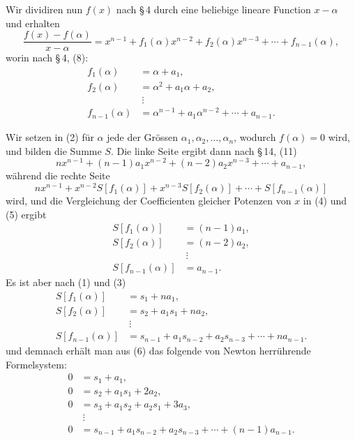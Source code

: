 \documentclass[11pt]{article}
\begin{document}
Wir dividiren nun $f(x)$ nach \S\,4 durch eine beliebige lineare Function $x-\alpha$ und erhalten
\begin{equation}
 \frac{f(x)-f(\alpha)}{x-\alpha}
   =x^{n-1}+f_1(\alpha)x^{n-2}+f_2(\alpha)x^{n-3}+\cdots+f_{n-1}(\alpha),
\tag{2}
\end{equation}
worin nach \S\,4, (8):
\begin{equation}
\begin{aligned}
 f_1(\alpha)&=\alpha+a_1,\\
 f_2(\alpha)&=\alpha^2+a_1\alpha+a_2,\\
 &\ \vdots\\
 f_{n-1}(\alpha)&=\alpha^{n-1}+a_1\alpha^{n-2}+\cdots+a_{n-1}.
\end{aligned}
\tag{3}
\end{equation}

Wir setzen in (2) für $\alpha$ jede der Grössen $\alpha_1,\alpha_2,\ldots,\alpha_n$, wodurch $f(\alpha)=0$ wird, und bilden die Summe $S$. Die linke Seite ergibt dann nach \S\,14, (11)
\begin{equation}
 n x^{n-1}+(n-1)a_1x^{n-2}+(n-2)a_2x^{n-3}+\cdots+a_{n-1},
\tag{4}
\end{equation}
während die rechte Seite
\begin{equation}
 n x^{n-1}+x^{n-2}S[f_1(\alpha)]+x^{n-3}S[f_2(\alpha)]+\cdots+S[f_{n-1}(\alpha)]
\tag{5}
\end{equation}
wird, und die Vergleichung der Coefficienten gleicher Potenzen von $x$ in (4) und (5) ergibt
\begin{equation}
\begin{aligned}
 S[f_1(\alpha)]&=(n-1)a_1,\\
 S[f_2(\alpha)]&=(n-2)a_2,\\
 &\ \vdots\\
 S[f_{n-1}(\alpha)]&=a_{n-1}.
\end{aligned}
\tag{6}
\end{equation}
Es ist aber nach (1) und (3)
\[
\begin{aligned}
 S[f_1(\alpha)]&=s_1+na_1,\\
 S[f_2(\alpha)]&=s_2+a_1s_1+na_2,\\
 &\ \vdots\\
 S[f_{n-1}(\alpha)]&=s_{n-1}+a_1s_{n-2}+a_2s_{n-3}+\cdots+na_{n-1}.
\end{aligned}
\]
und demnach erhält man aus (6) das folgende von Newton herrührende Formelsystem:
\begin{equation}
\begin{aligned}
0&=s_1+a_1,\\
0&=s_2+a_1s_1+2a_2,\\
0&=s_3+a_1s_2+a_2s_1+3a_3,\\
&\ \vdots\\
0&=s_{n-1}+a_1s_{n-2}+a_2s_{n-3}+\cdots+(n-1)a_{n-1}.
\end{aligned}
\tag{7}
\end{equation}
\end{document}
